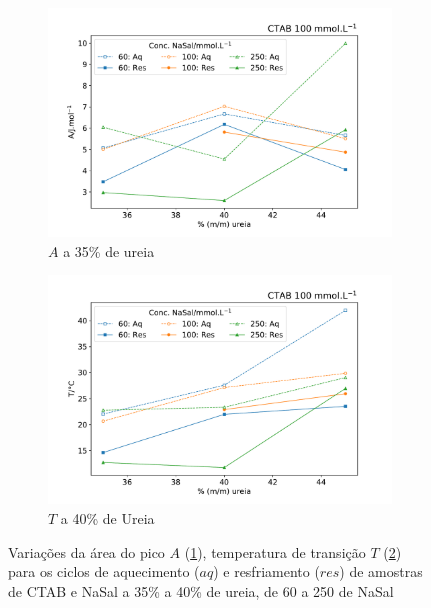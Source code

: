  		\begin{figure}[H]
			\centering
			\begin{subfigure}[t]{0.45\textwidth}
				\includegraphics[width=\textwidth]{./imagens/dsc/A_NaSal_c_UR_aq_res}
				\caption{$A$ a 35\% de ureia}
				\label{fig:DSC_A_NaSal}
			\end{subfigure} \qquad %
			\begin{subfigure}[t]{0.45\textwidth}
				\includegraphics[width=\textwidth]{./imagens/dsc/T_NaSal_c_UR_aq_res}
				\caption{$T$ a 40\% de Ureia}
				\label{fig:DSC_T_NaSal}
			\end{subfigure}
			
			\caption{Variações da área do pico $A$ (\ref{fig:DSC_A_NaSal}), temperatura de transição $T$ (\ref{fig:DSC_T_NaSal}) para os ciclos de aquecimento ($aq$) e resfriamento ($res$) de amostras de CTAB e NaSal a 35\% a 40\% de ureia, de 60 a 250 \mM{} de NaSal}
			\label{fig:DSC_propriedades_NaSal}
		\end{figure}
			
